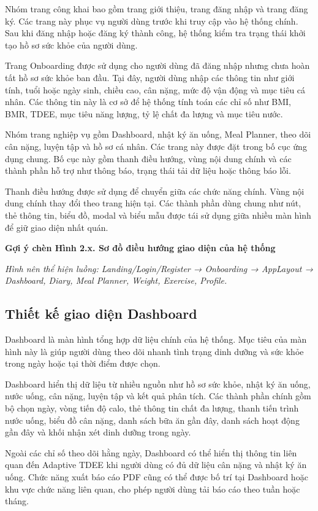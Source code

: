 \documentclass[12pt, a4paper]{report}
\begin{document}
Nhóm trang công khai bao gồm trang giới thiệu, trang đăng nhập và trang đăng ký. Các trang này phục vụ người dùng trước khi truy cập vào hệ thống chính. Sau khi đăng nhập hoặc đăng ký thành công, hệ thống kiểm tra trạng thái khởi tạo hồ sơ sức khỏe của người dùng.

Trang Onboarding được sử dụng cho người dùng đã đăng nhập nhưng chưa hoàn tất hồ sơ sức khỏe ban đầu. Tại đây, người dùng nhập các thông tin như giới tính, tuổi hoặc ngày sinh, chiều cao, cân nặng, mức độ vận động và mục tiêu cá nhân. Các thông tin này là cơ sở để hệ thống tính toán các chỉ số như BMI, BMR, TDEE, mục tiêu năng lượng, tỷ lệ chất đa lượng và mục tiêu nước.

Nhóm trang nghiệp vụ gồm Dashboard, nhật ký ăn uống, Meal Planner, theo dõi cân nặng, luyện tập và hồ sơ cá nhân. Các trang này được đặt trong bố cục ứng dụng chung. Bố cục này gồm thanh điều hướng, vùng nội dung chính và các thành phần hỗ trợ như thông báo, trạng thái tải dữ liệu hoặc thông báo lỗi.

Thanh điều hướng được sử dụng để chuyển giữa các chức năng chính. Vùng nội dung chính thay đổi theo trang hiện tại. Các thành phần dùng chung như nút, thẻ thông tin, biểu đồ, modal và biểu mẫu được tái sử dụng giữa nhiều màn hình để giữ giao diện nhất quán.

\textbf{Gợi ý chèn Hình 2.x. Sơ đồ điều hướng giao diện của hệ thống}

\textit{Hình nên thể hiện luồng: Landing/Login/Register → Onboarding → AppLayout → Dashboard, Diary, Meal Planner, Weight, Exercise, Profile.}

\subsection{Thiết kế giao diện Dashboard}Dashboard là màn hình tổng hợp dữ liệu chính của hệ thống. Mục tiêu của màn hình này là giúp người dùng theo dõi nhanh tình trạng dinh dưỡng và sức khỏe trong ngày hoặc tại thời điểm được chọn.

Dashboard hiển thị dữ liệu từ nhiều nguồn như hồ sơ sức khỏe, nhật ký ăn uống, nước uống, cân nặng, luyện tập và kết quả phân tích. Các thành phần chính gồm bộ chọn ngày, vòng tiến độ calo, thẻ thông tin chất đa lượng, thanh tiến trình nước uống, biểu đồ cân nặng, danh sách bữa ăn gần đây, danh sách hoạt động gần đây và khối nhận xét dinh dưỡng trong ngày.

Ngoài các chỉ số theo dõi hằng ngày, Dashboard có thể hiển thị thông tin liên quan đến Adaptive TDEE khi người dùng có đủ dữ liệu cân nặng và nhật ký ăn uống. Chức năng xuất báo cáo PDF cũng có thể được bố trí tại Dashboard hoặc khu vực chức năng liên quan, cho phép người dùng tải báo cáo theo tuần hoặc tháng.
\end{document}
